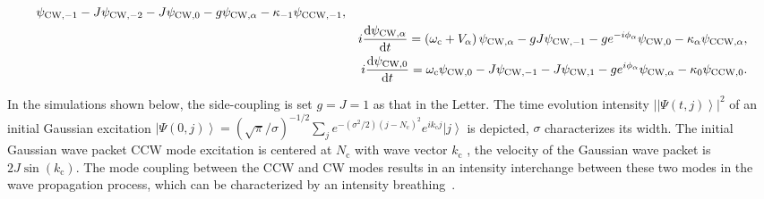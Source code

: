 \documentclass[prl,showpacs,superscriptaddress,twocolumn]{revtex4-1}
\begin{document}
\begin{widetext}
\begin{eqnarray}
{}\psi _{\mathrm{CW,}-1}-J\psi _{\mathrm{CW,}-2}-J\psi _{\mathrm{CW,}0}-g\psi
_{\mathrm{CW,}\alpha }-\kappa _{-1}\psi _{\mathrm{CCW,}-1}, \\
&&i\frac{\mathrm{d}\psi _{\mathrm{CW,}\alpha }}{\mathrm{d}t}=\left( \omega _{%
\mathrm{c}}+V_{\alpha }\right) \psi _{\mathrm{CW,}\alpha }-gJ\psi _{\mathrm{%
CW,}-1}-ge^{-i\phi _{\alpha }}\psi _{\mathrm{CW,}0}-\kappa _{\alpha }\psi _{%
\mathrm{CCW,}\alpha }, \\
&&i\frac{\mathrm{d}\psi _{\mathrm{CW,}0}}{\mathrm{d}t}=\omega _{\mathrm{c}%
}\psi _{\mathrm{CW,}0}-J\psi _{\mathrm{CW,}-1}-J\psi _{\mathrm{CW,}%
1}-ge^{i\phi _{\alpha }}\psi _{\mathrm{CW,}\alpha }-\kappa _{0}\psi _{%
\mathrm{CCW,}0}.
\end{eqnarray}

In the simulations shown below, the side-coupling is set $g=J=1$ as that in
the Letter. The time evolution intensity $\left\vert \left\vert \Psi \left(
t,j\right) \right\rangle \right\vert ^{2}$ of an initial Gaussian excitation
$\left\vert \Psi \left( 0,j\right) \right\rangle =(\sqrt{\pi }/\sigma
)^{-1/2}\sum_{j}e^{-(\sigma ^{2}/2)\left( j-N_{\mathrm{c}}\right)
^{2}}e^{ik_{\mathrm{c}}j}\left\vert j\right\rangle $ is depicted, $\sigma $
characterizes its width. The initial Gaussian wave packet CCW mode
excitation is centered at $N_{\mathrm{c}}$ with wave vector $k_{\mathrm{c}}$%
, the velocity of the Gaussian wave packet is $2J\sin \left( k_{\mathrm{c}%
}\right) $. The mode coupling between the CCW and CW modes results in an
intensity interchange between these two modes in the wave propagation
process, which can be characterized by an intensity breathing~\cite{LJin}.


\end{widetext}
\end{document}
